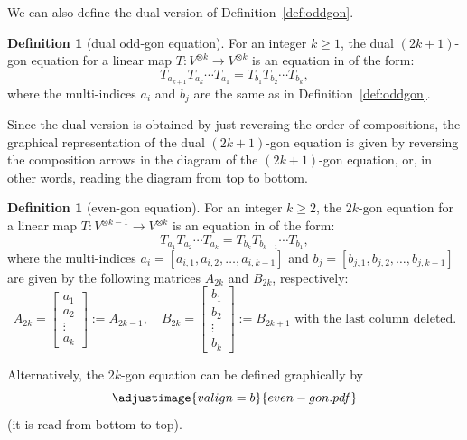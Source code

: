 \documentclass[pdftex]{sigma}
\numberwithin{equation}{section}
\theoremstyle{definition}
\newtheorem{Definition}[Theorem]{Definition}
\begin{document}
We can also define the dual version of Definition~\ref{def:oddgon}.

\begin{Definition}[dual odd-gon equation]\label{def:dual oddgon}
 For an integer $k\geq 1$, the dual $(2k+1)$-gon equation for a linear map $T\colon V^{\otimes k}\to V^{\otimes k}$ is an equation in  of the form:
 \begin{equation*}
 T_{a_{k+1}}T_{a_k}\cdots T_{a_1} = T_{b_1}T_{b_2}\cdots T_{b_k},
 \end{equation*}
 where the multi-indices $a_i$ and $b_j$ are the same as in Definition~\ref{def:oddgon}.

 Since the dual version is obtained by just reversing the order of compositions, the graphical representation of the dual $(2k+1)$-gon equation is given by reversing the composition arrows in the diagram of the $(2k+1)$-gon equation, or, in other words, reading the diagram from top to bottom.
\end{Definition}

\begin{Definition}[even-gon equation]\label{def:evengon}
 For an integer $k\geq 2$, the $2k$-gon equation for a linear map $T\colon V^{\otimes k-1}\to V^{\otimes k}$ is an equation in  of the form:
 \begin{equation*}
 T_{a_1}T_{a_2}\cdots T_{a_{k}} = T_{b_{k}}T_{b_{k-1}}\cdots T_{b_1},
 \end{equation*}
 where the multi-indices $a_i=[a_{i,1},a_{i,2},\dots, a_{i,k-1}]$ and $b_j=[b_{j,1},b_{j,2},\dots, b_{j,k-1}]$ are given by the following matrices $A_{2k}$ and $B_{2k}$, respectively:
 \begin{equation*}
 A_{2k}=\begin{bmatrix}
 a_1\\
 a_2\\
 \vdots\\
 a_{k}
 \end{bmatrix}:=A_{2k-1},\quad
 B_{2k} = \begin{bmatrix}
 b_1\\
 b_2\\
 \vdots\\
 b_{k}
 \end{bmatrix}
 := \text{$B_{2k+1}$ with the last column deleted.}
 \end{equation*}

 Alternatively, the $2k$-gon equation can be defined graphically by
 \begin{equation*}
 \adjustimage{valign=b}{even-gon.pdf}
 \end{equation*}
 (it is read from bottom to top).
\end{Definition}
\end{document}
